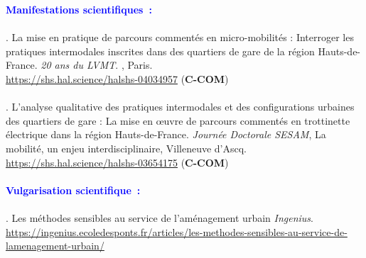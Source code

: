 \begin{refsegment}
    \begin{tcolorbox}[colback=white!5!white,
                      colframe=blue!75!blue,
                      title=Valorisation scientifique
                      \\
                      Chapitre~3]
\Large{\textcolor{blue}{\textbf{Manifestations scientifiques~:}}}
    \\\\
\small{\textcolor{blue}{\textcite{moinse_mise_2023}}. La mise en pratique de parcours commentés en micro-mobilités : Interroger les pratiques intermodales inscrites dans des quartiers de gare de la région Hauts-de-France. \textsl{20 ans du LVMT}. , Paris.
\\
\footnotesize{\url{https://shs.hal.science/halshs-04034957}} (\textbf{C-COM})}
    \\\\
\small{\textcolor{blue}{\textcite{moinse_analyse_2022}}. L'analyse qualitative des pratiques intermodales et des configurations urbaines des quartiers de gare : La mise en œuvre de parcours commentés en trottinette électrique dans la région Hauts-de-France. \textsl{Journée Doctorale SESAM}, La mobilité, un enjeu interdisciplinaire, Villeneuve d'Ascq.
\\
\footnotesize{\url{https://shs.hal.science/halshs-03654175}} (\textbf{C-COM})}
    \\\\
\Large{\textcolor{blue}{\textbf{Vulgarisation scientifique~:}}}
    \\\\
\small{\textcolor{blue}{\textcite{lehmann_methodes_2023}}. Les méthodes sensibles au service de l’aménagement urbain \textsl{Ingenius}. 
\\
\footnotesize{\url{https://ingenius.ecoledesponts.fr/articles/les-methodes-sensibles-au-service-de-lamenagement-urbain/}}}
    \end{tcolorbox}

    \newpage
    \begingroup
    \renewcommand{\bibfont}{\scriptsize}
\printbibliography[segment=\therefsegment, heading=subbibintoc, title={Sous-bibliographie du chapitre~3}, label=chap3:bibliographie]
    \endgroup
    \end{refsegment}